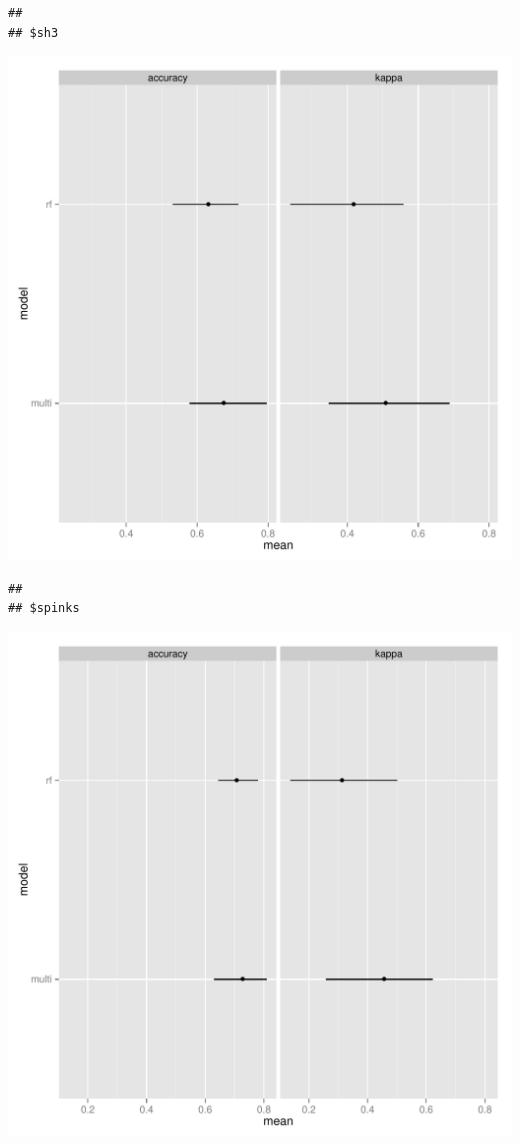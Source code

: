 \documentclass{article}\usepackage{graphicx, color}
\makeatletter
\def\maxwidth{ %
  \ifdim\Gin@nat@width>\linewidth
    \linewidth
  \else
    \Gin@nat@width
  \fi
}
\newenvironment{kframe}{%
 \def\at@end@of@kframe{}%
 \ifinner\ifhmode%
  \def\at@end@of@kframe{\end{minipage}}%
  \begin{minipage}{\columnwidth}%
 \fi\fi%
 \def\FrameCommand##1{\hskip\@totalleftmargin \hskip-\fboxsep
 \colorbox{shadecolor}{##1}\hskip-\fboxsep
     \hskip-\linewidth \hskip-\@totalleftmargin \hskip\columnwidth}%
 \MakeFramed {\advance\hsize-\width
   \@totalleftmargin\z@ \linewidth\hsize
   \@setminipage}}%
 {\par\unskip\endMakeFramed%
 \at@end@of@kframe}
\newenvironment{knitrout}{}{} %
\makeatother
\begin{document}
\begin{knitrout}
\begin{kframe}\begin{verbatim}
## 
## $sh3
\end{verbatim}
\end{kframe}
\includegraphics[width=\maxwidth]{figure/resamp3} 
\begin{kframe}\begin{verbatim}
## 
## $spinks
\end{verbatim}
\end{kframe}
\includegraphics[width=\maxwidth]{figure/resamp4} 


\end{knitrout}
\end{document}
